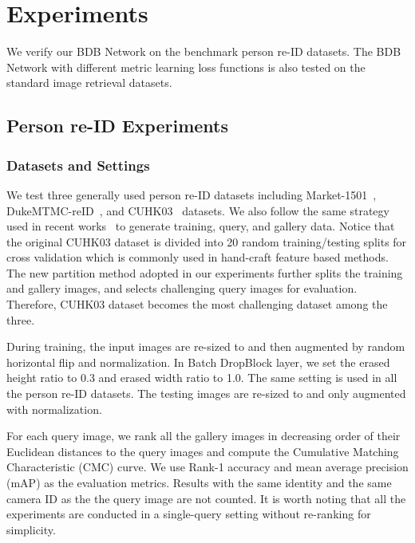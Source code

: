 \documentclass[10pt,twocolumn,letterpaper]{article}
\begin{document}
\section{Experiments}
We verify our BDB Network on the benchmark person re-ID datasets.
The BDB Network with different metric learning loss functions is also tested on the standard image retrieval datasets. 

\subsection{Person re-ID Experiments}
\subsubsection{Datasets and Settings}
We test three generally used person re-ID datasets including Market-1501~\cite{zheng2015scalable}, DukeMTMC-reID~\cite{Ristani2016Performance,zheng2017unlabeled}, and CUHK03~\cite{Li2014DeepReID} datasets. 
We also follow the same strategy used in recent works~\cite{hermans2017defense, sun2017beyond, wang2018mgn} to generate training, query, and gallery data.
Notice that the original CUHK03 dataset is divided into 20 random training/testing splits for cross validation which is commonly used in hand-craft feature based methods. 
The new partition method adopted in our experiments further splits the training and gallery images, and selects challenging query images for evaluation. 
Therefore, CUHK03 dataset becomes the most challenging dataset among the three.

During training, the input images are re-sized to  and then augmented by random horizontal flip and normalization.
In Batch DropBlock layer, we set the erased height ratio  to 0.3 and erased width ratio  to 1.0. The same setting is used in all the person re-ID datasets. The testing images are re-sized to  and only augmented with normalization.

For each query image, we rank all the gallery images in decreasing order of their Euclidean distances to the query images and compute the Cumulative Matching Characteristic (CMC) curve. 
We use Rank-1 accuracy and mean average precision (mAP) as the evaluation metrics. 
Results with the same identity and the same camera ID as the the query image are not counted. 
It is worth noting that all the experiments are conducted in a single-query setting without re-ranking\cite{bai2017reid,zhong2017re} for simplicity.
\vspace{-3mm}
\end{document}
